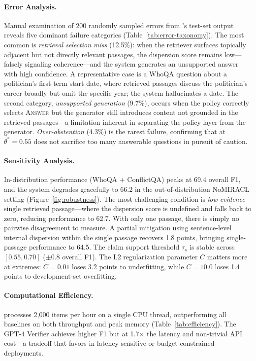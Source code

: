 \paragraph{Error Analysis.}
Manual examination of 200 randomly sampled errors from \method{}'s test-set output reveals five dominant failure categories (Table~\ref{tab:error-taxonomy}). The most common is \emph{retrieval selection miss} (12.5\%): when the retriever surfaces topically adjacent but not directly relevant passages, the dispersion score remains low---falsely signaling coherence---and the system generates an unsupported answer with high confidence. A representative case is a WhoQA question about a politician's first term start date, where retrieved passages discuss the politician's career broadly but omit the specific year; the system hallucinates a date. The second category, \emph{unsupported generation} (9.7\%), occurs when the policy correctly selects \textsc{Answer} but the generator still introduces content not grounded in the retrieved passages---a limitation inherent in separating the policy layer from the generator. \emph{Over-abstention} (4.3\%) is the rarest failure, confirming that \method{} at $\theta^* = 0.55$ does not sacrifice too many answerable questions in pursuit of caution.

\paragraph{Sensitivity Analysis.}
In-distribution performance (WhoQA + ConflictQA) peaks at 69.4 overall F1, and the system degrades gracefully to 66.2 in the out-of-distribution NoMIRACL setting (Figure~\ref{fig:robustness}). The most challenging condition is \emph{low evidence}---single retrieved passage---where the dispersion score is undefined and falls back to zero, reducing performance to 62.7. With only one passage, there is simply no pairwise disagreement to measure. A partial mitigation using sentence-level internal dispersion within the single passage recovers 1.8 points, bringing single-passage performance to 64.5. The claim support threshold $\tau_s$ is stable across $[0.55, 0.70]$ ($\pm 0.8$ overall F1). The L2 regularization parameter $C$ matters more at extremes: $C = 0.01$ loses 3.2 points to underfitting, while $C = 10.0$ loses 1.4 points to development-set overfitting.

\paragraph{Computational Efficiency.}
\method{} processes 2,000 items per hour on a single CPU thread, outperforming all baselines on both throughput and peak memory (Table~\ref{tab:efficiency}). The GPT-4 Verifier achieves higher F1 but at 1.7$\times$ the latency and non-trivial API cost---a tradeoff that favors \method{} in latency-sensitive or budget-constrained deployments.

